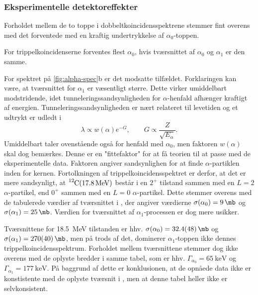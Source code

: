 \subsubsection{Eksperimentelle detektoreffekter}
\label{sec:data-detek}

Forholdet mellem de to toppe i dobbeltkoincidensspektrene stemmer fint overens med det forventede med
en kraftig undertrykkelse af $\alpha_{0}$-toppen.

For trippelkoincidenserne forventes flest $\alpha_{0}$, hvis tværsnittet af $\alpha_{0}$ og
$\alpha_{1}$ er den samme.

For spektret på \cref{fig:alpha-spec}b er det modsatte tilfældet. Forklaringen kan være, at
tværsnittet for $\alpha_{1}$ er væsentligt større. Dette virker umiddelbart modstridende, idet
tunneleringssandsynligheden for $\alpha$-henfald afhænger kraftigt af
energien. Tunneleringssandsynligheden er nært relateret til levetiden og et udtrykt er udledt i
\cite[s. 236]{Martin}
\begin{equation}
  \label{eq:SStunnel}
  \lambda \propto w(\alpha) e^{-G}, \qquad G \propto \frac{Z}{\sqrt{E_{\alpha}}}.
\end{equation}
Umiddelbart taler ovenstående også for henfald med $\alpha_{0}$, men faktoren $w(\alpha)$ skal dog
bemærkes. Denne er en "fittefaktor"{} for at få teorien til at passe med de eksperimentelle
data. Faktoren angiver sandsynlighen for at finde $\alpha$-partiklen inden for kernen. Fortolkningen af
trippelkoincidensspektret er derfor, at det er mere sandsynligt, at $\Carb(\SI{17.8}{\MeV})$ består
\Be i en $2^{+}$ tilstand sammen med en $L=2$ $\alpha$-partikel, end $0^{+}$ \Be sammen med
en $L=0$ $\alpha$-partikel. Dette stemmer overens med de tabulerede værdier af tværsnittet i
\cite{States}, der angiver værdierne $\sigma(\alpha_{0}) = \SI{9}{\mb}$ og
$\sigma(\alpha_{1}) = \SI{25}{\mb}$. Værdien for tværsnittet af $\alpha_{1}$-processen er dog mere usikker.

Tværsnittene for \SI{18.5}{\MeV} tilstanden er hhv.  $\sigma(\alpha_{0}) = \SI{32.4\pm4.8}{\mb}$ og
$\sigma(\alpha_{1}) = \SI{270\pm40}{\mb}$, men på trods af det, dominerer $\alpha_{1}$-toppen ikke dennes
trippelkoincidensspektrum. Forholdet mellem tværsnittene stemmer dog ikke overens med de oplyste
bredder i samme tabel, som er hhv.  $\Gamma_{\alpha_{0}} = \SI{65}{\keV}$ og
$\Gamma_{\alpha_{1}} = \SI{177}{\keV}$. På baggrund af dette er konklusionen, at de opnåede data ikke er
konstistente med de oplyste tværsnit i \cite{States}, men at denne tabel heller ikke er
selvkonsistent.


